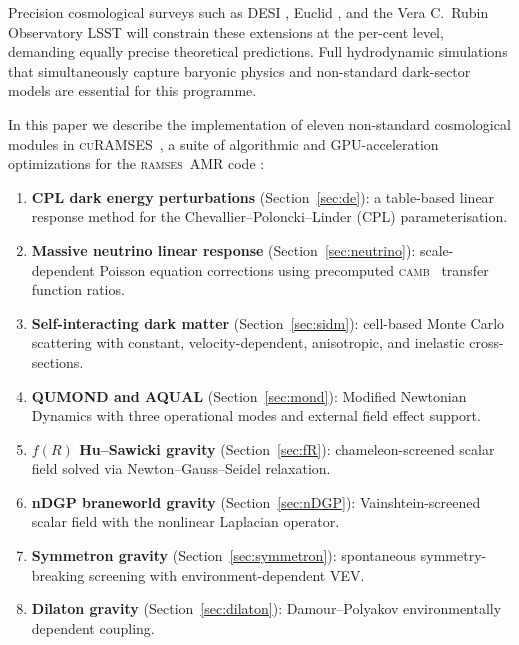 \documentclass[fleqn,usenatbib]{mnras}
\newcommand{\ramses}{\textsc{ramses}}
\newcommand{\curamses}{\textsc{cuRAMSES}}
\newcommand{\camb}{\textsc{camb}}
\newcommand{\fR}{f(R)}
\begin{document}
Precision cosmological surveys such as DESI \citep{DESI2024}, Euclid
\citep{EuclidCollaboration2024}, and the Vera C.\ Rubin Observatory
LSST \citep{Ivezic2019} will constrain these extensions at the
per-cent level, demanding equally precise theoretical predictions.
Full hydrodynamic simulations that simultaneously capture baryonic
physics and non-standard dark-sector models are essential for this
programme.

In this paper we describe the implementation of eleven non-standard
cosmological modules in \curamses\ \citep{Kim2026}, a suite of
algorithmic and GPU-acceleration optimizations for the \ramses\ AMR
code \citep{Teyssier2002}:

\begin{enumerate}
\item \textbf{CPL dark energy perturbations}
  (Section~\ref{sec:de}): a table-based linear response method for
  the Chevallier--Poloncki--Linder (CPL) parameterisation.

\item \textbf{Massive neutrino linear response}
  (Section~\ref{sec:neutrino}): scale-dependent Poisson equation
  corrections using precomputed \camb\ \citep{Lewis2000} transfer
  function ratios.

\item \textbf{Self-interacting dark matter}
  (Section~\ref{sec:sidm}): cell-based Monte Carlo scattering
  with constant, velocity-dependent, anisotropic, and inelastic
  cross-sections.

\item \textbf{QUMOND and AQUAL} (Section~\ref{sec:mond}):
  Modified Newtonian Dynamics with three operational modes and
  external field effect support.

\item \textbf{$\fR$ Hu--Sawicki gravity}
  (Section~\ref{sec:fR}): chameleon-screened scalar field solved
  via Newton--Gauss--Seidel relaxation.

\item \textbf{nDGP braneworld gravity}
  (Section~\ref{sec:nDGP}): Vainshtein-screened scalar field with
  the nonlinear Laplacian operator.

\item \textbf{Symmetron gravity}
  (Section~\ref{sec:symmetron}): spontaneous symmetry-breaking
  screening with environment-dependent VEV.

\item \textbf{Dilaton gravity}
  (Section~\ref{sec:dilaton}): Damour--Polyakov environmentally
  dependent coupling.


\end{enumerate}
\end{document}
